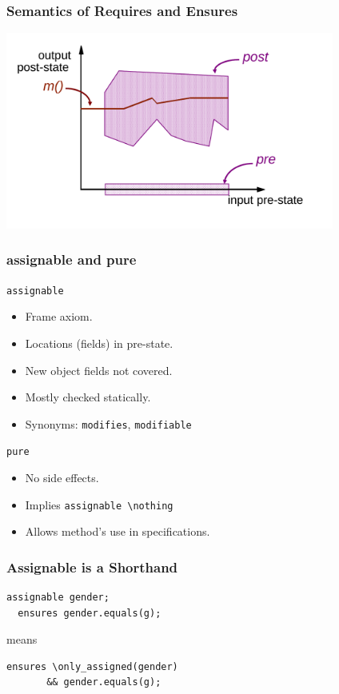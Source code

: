 \begin{frame}
\frametitle{Semantics of Requires and Ensures}
\includegraphics[width=4.25in]{correctimpl}
\end{frame}

\begin{frame}[fragile]
\frametitle{assignable and pure}

\lstinline!assignable!
\begin{itemize}
\item
Frame axiom.

\item
Locations (fields) in pre-state.

\item
New object fields not covered.

\item
Mostly checked statically.

\item
Synonyms: \lstinline!modifies!, \lstinline!modifiable!
\end{itemize}

\lstinline!pure!
\begin{itemize}
\item
No side effects.

\item
Implies \lstinline!assignable \nothing!

\item
Allows method's use in specifications.
\end{itemize}
\end{frame}

\begin{frame}[fragile]
\frametitle{Assignable is a Shorthand}
\begin{lstlisting}[mathescape=true]
  assignable gender;
  ensures gender.equals(g);
\end{lstlisting}

means

\begin{lstlisting}[mathescape=true]
  ensures \only_assigned(gender)
       && gender.equals(g);
\end{lstlisting}
\end{frame}

